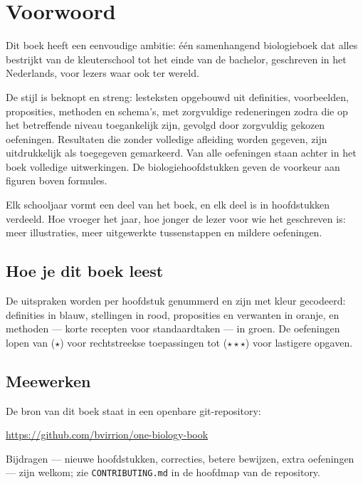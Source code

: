 \chapter{Voorwoord}

Dit boek heeft een eenvoudige ambitie: één samenhangend biologieboek dat
alles bestrijkt van de kleuterschool tot het einde van de bachelor,
geschreven in het Nederlands, voor lezers waar ook ter wereld.

De stijl is beknopt en streng: lesteksten opgebouwd uit definities,
voorbeelden, proposities, methoden en schema's, met zorgvuldige
redeneringen zodra die op het betreffende niveau toegankelijk zijn,
gevolgd door zorgvuldig gekozen oefeningen. Resultaten die zonder
volledige afleiding worden gegeven, zijn uitdrukkelijk als toegegeven
gemarkeerd. Van alle oefeningen staan achter in het boek volledige
uitwerkingen. De biologiehoofdstukken geven de voorkeur aan figuren boven
formules.

Elk schooljaar vormt een deel van het boek, en elk deel is in hoofdstukken
verdeeld. Hoe vroeger het jaar, hoe jonger de lezer voor wie het geschreven
is: meer illustraties, meer uitgewerkte tussenstappen en mildere
oefeningen.

\section*{Hoe je dit boek leest}

De uitspraken worden per hoofdstuk genummerd en zijn met kleur gecodeerd:
definities in blauw, stellingen in rood, proposities en verwanten in
oranje, en methoden --- korte recepten voor standaardtaken --- in groen.
De oefeningen lopen van ($\star$) voor rechtstreekse toepassingen tot
($\star\star\star$) voor lastigere opgaven.

\section*{Meewerken}

De bron van dit boek staat in een openbare git-repository:
\begin{center}
\url{https://github.com/bvirrion/one-biology-book}
\end{center}
Bijdragen --- nieuwe hoofdstukken, correcties, betere bewijzen, extra
oefeningen --- zijn welkom; zie \texttt{CONTRIBUTING.md} in de hoofdmap van
de repository.
